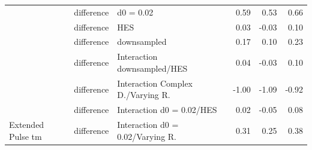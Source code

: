 \documentclass[11pt]{article}
\begin{document}
\begin{table}[H]
\begin{tabular}[t]{l|l|l|r|r|r}
 & difference & d0 = 0.02 & 0.59 & 0.53 & 0.66\\

 & difference & HES & 0.03 & -0.03 & 0.10\\

 & difference & downsampled & 0.17 & 0.10 & 0.23\\

 & difference & Interaction downsampled/HES & 0.04 & -0.03 & 0.10\\

 & difference & Interaction Complex D./Varying R. & -1.00 & -1.09 & -0.92\\

 & difference & Interaction d0 = 0.02/HES & 0.02 & -0.05 & 0.08\\

\multirow{-11}{*}{\raggedright\arraybackslash Extended Pulse tm} & difference & Interaction d0 = 0.02/Varying R. & 0.31 & 0.25 & 0.38\\
\hline
\end{tabular}
\end{table}
\end{document}
